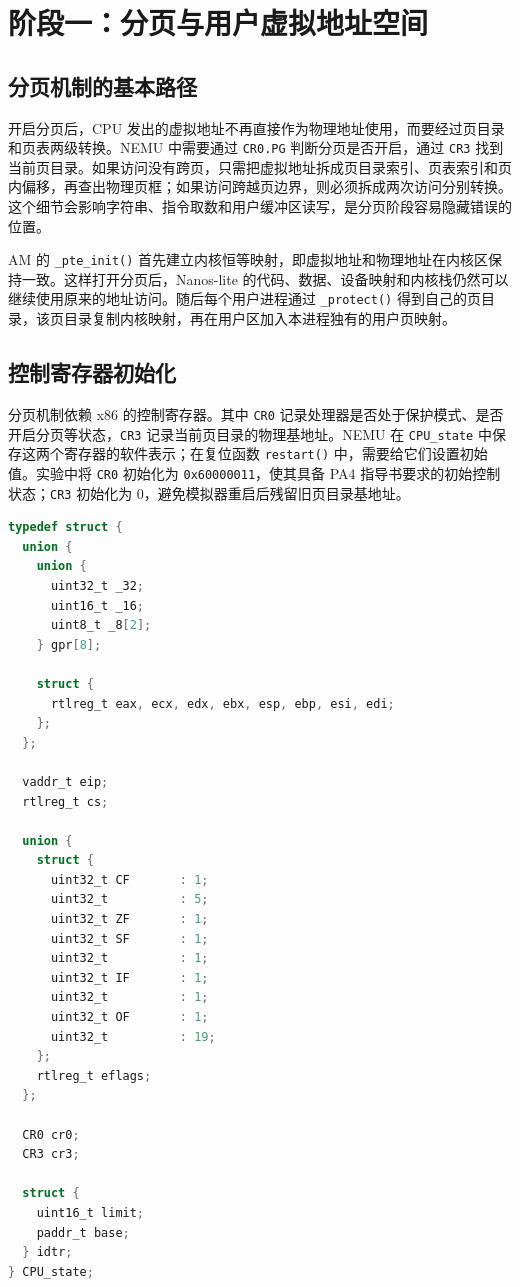 \section{阶段一：分页与用户虚拟地址空间}

\subsection{分页机制的基本路径}

开启分页后，CPU 发出的虚拟地址不再直接作为物理地址使用，而要经过页目录和页表两级转换。NEMU 中需要通过 \texttt{CR0.PG} 判断分页是否开启，通过 \texttt{CR3} 找到当前页目录。如果访问没有跨页，只需把虚拟地址拆成页目录索引、页表索引和页内偏移，再查出物理页框；如果访问跨越页边界，则必须拆成两次访问分别转换。这个细节会影响字符串、指令取数和用户缓冲区读写，是分页阶段容易隐藏错误的位置。

AM 的 \texttt{\_pte\_init()} 首先建立内核恒等映射，即虚拟地址和物理地址在内核区保持一致。这样打开分页后，Nanos-lite 的代码、数据、设备映射和内核栈仍然可以继续使用原来的地址访问。随后每个用户进程通过 \texttt{\_protect()} 得到自己的页目录，该页目录复制内核映射，再在用户区加入本进程独有的用户页映射。

\subsection{控制寄存器初始化}

分页机制依赖 x86 的控制寄存器。其中 \texttt{CR0} 记录处理器是否处于保护模式、是否开启分页等状态，\texttt{CR3} 记录当前页目录的物理基地址。NEMU 在 \texttt{CPU\_state} 中保存这两个寄存器的软件表示；在复位函数 \texttt{restart()} 中，需要给它们设置初始值。实验中将 \texttt{CR0} 初始化为 \texttt{0x60000011}，使其具备 PA4 指导书要求的初始控制状态；\texttt{CR3} 初始化为 0，避免模拟器重启后残留旧页目录基地址。

\begin{lstlisting}[language=C,caption={\texttt{CPU\_state} 中的 CR0/CR3 寄存器字段},frame=single]
typedef struct {
  union {
    union {
      uint32_t _32;
      uint16_t _16;
      uint8_t _8[2];
    } gpr[8];

    struct {
      rtlreg_t eax, ecx, edx, ebx, esp, ebp, esi, edi;
    };
  };

  vaddr_t eip;
  rtlreg_t cs;

  union {
    struct {
      uint32_t CF       : 1;
      uint32_t          : 5;
      uint32_t ZF       : 1;
      uint32_t SF       : 1;
      uint32_t          : 1;
      uint32_t IF       : 1;
      uint32_t          : 1;
      uint32_t OF       : 1;
      uint32_t          : 19;
    };
    rtlreg_t eflags;
  };

  CR0 cr0;
  CR3 cr3;

  struct {
    uint16_t limit;
    paddr_t base;
  } idtr;
} CPU_state;
\end{lstlisting}

